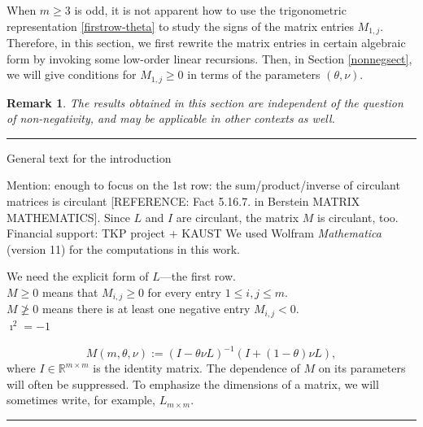 \documentclass[a4paper]{article}
\newtheorem{remark}{Remark}
\newcommand{\te}{\theta}
\newcommand{\rr}{\mathbb{R}}
\begin{document}
When $m\ge 3$ is odd, it is not apparent how to use the trigonometric representation \eqref{firstrow-theta} to study the signs of the matrix entries $M_{1,j}$. Therefore, in this section, we first rewrite the matrix entries in certain algebraic form by invoking some low-order linear recursions. Then, in Section \ref{nonnegsect}, we will give conditions for $M_{1,j}\ge 0$ in terms of the parameters $(\te,\nu)$.
\begin{remark}
The results obtained in this section are independent of the question of non-negativity, and may be applicable in other contexts as well. 
\end{remark}

\rule{8cm}{0.4pt}

General text for the introduction

 Mention: enough to focus on the 1st row: the sum/product/inverse of circulant matrices is circulant [REFERENCE: Fact 5.16.7. in Berstein MATRIX MATHEMATICS]. Since $L$ and $I$ are circulant, the matrix $M$ is circulant, too.\\
Financial support: TKP project + KAUST
We used Wolfram \textit{Mathematica} (version 11) for the computations in this work.




 We need the explicit form of $L$---the first row.\\

$M\ge 0$ means that  $M_{i,j}\ge 0$ for every entry $1\le i, j\le m$.\\

$M\not\ge 0$ means there is at least one negative entry $M_{i,j}<0$.\\

$\imath^2=-1$ 

\begin{equation}\label{Mdef}
M(m,\te,\nu):=(I-\te\nu L)^{-1}(I+(1-\te)\nu L),
\end{equation}
where $I\in\rr^{m\times m}$ is the identity matrix. The dependence of $M$ on its parameters will often be suppressed. To emphasize the dimensions of a matrix, we will sometimes write, for example, $L_{m\times m}$.

\rule{8cm}{0.4pt}
\end{document}
